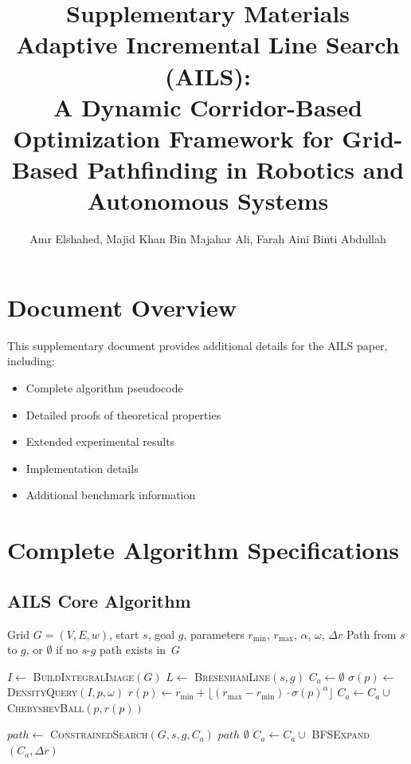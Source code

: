 \documentclass[11pt]{article}
\title{Supplementary Materials\\
\Large Adaptive Incremental Line Search (AILS): \\
A Dynamic Corridor-Based Optimization Framework for Grid-Based Pathfinding in Robotics and Autonomous Systems}
\author{Amr Elshahed, Majid Khan Bin Majahar Ali, Farah Aini Binti Abdullah}
\date{}
\begin{document}
\maketitle

\section*{Document Overview}

This supplementary document provides additional details for the AILS paper, including:
\begin{itemize}
    \item Complete algorithm pseudocode
    \item Detailed proofs of theoretical properties
    \item Extended experimental results
    \item Implementation details
    \item Additional benchmark information
\end{itemize}

\tableofcontents
\newpage

\section{Complete Algorithm Specifications}

\subsection{AILS Core Algorithm}

\begin{algorithm}[H]
\caption{AILS: Adaptive Incremental Line Search}
\label{alg:ails_complete}
\begin{algorithmic}[1]
\REQUIRE Grid $G=(V,E,w)$, start $s$, goal $g$, parameters $r_{\min}$, $r_{\max}$, $\alpha$, $\omega$, $\Delta r$
\ENSURE Path from $s$ to $g$, or $\emptyset$ if no $s$-$g$ path exists in~$G$

\STATE $I \gets$ \textsc{BuildIntegralImage}$(G)$ 
\STATE $L \gets$ \textsc{BresenhamLine}$(s, g)$
\STATE $C_a \gets \emptyset$
    \STATE $\sigma(p) \gets$ \textsc{DensityQuery}$(I, p, \omega)$
    \STATE $r(p) \gets r_{\min} + \lfloor (r_{\max} - r_{\min}) \cdot \sigma(p)^\alpha \rfloor$
    \STATE $C_a \gets C_a \cup$ \textsc{ChebyshevBall}$(p, r(p))$
\ENDFOR

\REPEAT
    \STATE $path \gets$ \textsc{ConstrainedSearch}$(G, s, g, C_a)$
        \RETURN $path$
    \ENDIF
        \RETURN $\emptyset$ 
    \ENDIF
    \STATE $C_a \gets C_a \cup$ \textsc{BFSExpand}$(C_a, \Delta r)$ 
\end{algorithmic}
\end{algorithm}
\end{document}
